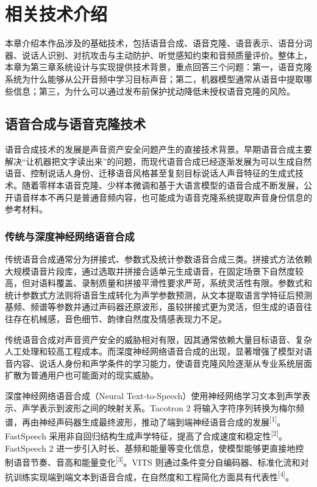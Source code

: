 \chapter{相关技术介绍}\label{ux7b2cux4e8cux7ae0-ux76f8ux5173ux6280ux672fux4ecbux7ecd}

本章介绍本作品涉及的基础技术，包括语音合成、语音克隆、语音表示、语音分词器、说话人识别、对抗攻击与主动防护、听觉感知约束和音频质量评价。整体上，本章为第三章系统设计与实现提供技术背景，重点回答三个问题：第一，语音克隆系统为什么能够从公开音频中学习目标声音；第二，机器模型通常从语音中提取哪些信息；第三，为什么可以通过发布前保护扰动降低未授权语音克隆的风险。

\section{语音合成与语音克隆技术}\label{ux8bedux97f3ux5408ux6210ux4e0eux8bedux97f3ux514bux9686ux6280ux672f}

语音合成技术的发展是声音资产安全问题产生的直接技术背景。早期语音合成主要解决``让机器把文字读出来''的问题，而现代语音合成已经逐渐发展为可以生成自然语音、控制说话人身份、迁移语音风格甚至复刻目标说话人声音特征的生成式技术。随着零样本语音克隆、少样本微调和基于大语言模型的语音合成不断发展，公开语音样本不再只是普通音频内容，也可能成为语音克隆系统提取声音身份信息的参考材料。

\subsection{传统与深度神经网络语音合成}\label{ux4f20ux7edfux4e0eux6df1ux5ea6ux795eux7ecfux7f51ux7edcux8bedux97f3ux5408ux6210}

传统语音合成通常分为拼接式、参数式及统计参数语音合成三类。拼接式方法依赖大规模语音片段库，通过选取并拼接合适单元生成语音，在固定场景下自然度较高，但对语料覆盖、录制质量和拼接平滑性要求严苛，系统灵活性有限。参数式和统计参数式方法则将语音生成转化为声学参数预测，从文本提取语言学特征后预测基频、频谱等参数并通过声码器还原波形，虽较拼接式更为灵活，但生成的语音往往存在机械感，音色细节、韵律自然度及情感表现力不足。

传统语音合成对声音资产安全的威胁相对有限，因其通常依赖大量目标语音、复杂人工处理和较高工程成本。而深度神经网络语音合成的出现，显著增强了模型对语音内容、说话人身份和声学条件的学习能力，使语音克隆风险逐渐从专业系统层面扩散为普通用户也可能面对的现实威胁。

深度神经网络语音合成（Neural
Text-to-Speech）使用神经网络学习文本到声学表示、声学表示到波形之间的映射关系。Tacotron
2
将输入字符序列转换为梅尔频谱，再由神经声码器生成最终波形，推动了端到端神经语音合成的发展\textsuperscript{{[}1{]}}。FastSpeech
采用非自回归结构生成声学特征，提高了合成速度和稳定性\textsuperscript{{[}2{]}}。FastSpeech
2
进一步引入时长、基频和能量等变化信息，使模型能够更直接地控制语音节奏、音高和能量变化\textsuperscript{{[}3{]}}。VITS
则通过条件变分自编码器、标准化流和对抗训练实现端到端文本到语音合成，在自然度和工程简化方面具有代表性\textsuperscript{{[}4{]}}。

